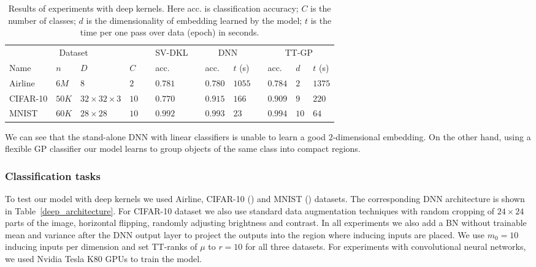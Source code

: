   \begin{table}[!t]
    \vspace{-.5cm}
    \caption{Results of experiments with deep kernels. Here acc. is classification
            accuracy; $C$ is the number of classes; $d$ is the dimensionality
            of embedding learned by the model; $t$ is the time per one pass over
            data (epoch) in seconds.}
    \label{deep_results}
    \centering
    \begin{tabular}{llll ll llll lll}
      \toprule
      \multicolumn{4}{c}{Dataset}  && SV-DKL &&
      \multicolumn{2}{c}{DNN} &&
      \multicolumn{3}{c}{TT-GP}\\

      \cmidrule{1-4}
      \cmidrule{6-6}
      \cmidrule{8-9}
      \cmidrule{11-13}

      Name & $n$ & $D$ & $C$ &&
      acc. && acc. & $t$ (s) &&
      acc. & $d$ & $t$ (s)
      \\
      \midrule



      Airline & $6M$ & $8$ & $2$ &&
      $0.781$ && $0.780$ & $1055$ &&
      $0.784$ & $2$ & $1375$\\

      CIFAR-10 & $50K$ & $32{\times}32{\times}3$ & $10$ &&
      $0.770$ && $0.915$ & $166$ &&
      $0.909$ & $9$ & $220$\\

      MNIST & $60K$ & $28{\times}28$ & $10$ &&
      $0.992$ && $0.993$ & $23$ &&
      $0.994$ & $10$ & $64$\\
      \bottomrule
    \end{tabular}
    \vspace{-.5cm}
  \end{table}

  We can see that the stand-alone DNN with linear classifiers is unable
  to learn a good $2$-dimensional embedding.
  On the other hand, using a flexible GP classifier our
  model learns to group objects of the same class into compact regions.

  \subsubsection{Classification tasks}
  To test our model with deep kernels we used Airline,
  CIFAR-10 (\citet{krizhevsky2009}) and
  MNIST (\citet{lecun1998}) datasets. The corresponding DNN architecture is shown in Table~\ref{deep_architecture}. For CIFAR-10 dataset we also use standard data augmentation techniques with random cropping of $24 \times 24$
  parts of the image, horizontal flipping, randomly adjusting brightness and contrast. In all experiments we also add a BN without trainable mean and
  variance after the DNN output layer to project the outputs into the region
  where inducing inputs are placed. We use $m_0 = 10$ inducing inputs
  per dimension and set TT-ranks of $\mu$ to $r = 10$ for all three datasets. For experiments with convolutional neural networks, we
  used Nvidia Tesla K80 GPUs to train the model.


